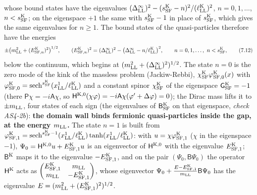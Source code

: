 \documentclass[
  10pt,
]{article}
\begin{document}
whose bound states have the eigenvalues
\((\Delta^\infty_{\rm LL})^2-(s^{\rm K}_{\rm SF}-n)^2/(\ell^{\rm K}_{\rm LL})^2\),
\(n=0,1,\dots\), \(n<s^{\rm K}_{\rm SF}\); on the eigenspace \(+1\) the
same with \(s^{\rm K}_{\rm SF}-1\) in place of \(s^{\rm K}_{\rm SF}\),
which gives the same eigenvalues for \(n\ge1\). The bound states of the
quasi-particles therefore have the energies
\[\pm\big(m_{\rm LL}^2+(E^{\rm K}_{{\rm SF},n})^2\big)^{1/2},\qquad(E^{\rm K}_{{\rm SF},n})^2=(\Delta^\infty_{\rm LL})^2-\big(\Delta^\infty_{\rm LL}-n/\ell^{\rm K}_{\rm LL}\big)^2,\qquad n=0,1,\dots,\ n<s^{\rm K}_{\rm SF},\tag{7.12}\]
below the continuum, which begins at
\((m_{\rm LL}^2+(\Delta^\infty_{\rm LL})^2)^{1/2}\). The state \(n=0\)
is the zero mode of the kink of the massless problem (Jackiw-Rebbi),
\(\chi^{\rm K}_{\rm SF}\varphi^{\rm K}_{{\rm SF},0}(x)\) with
\(\varphi^{\rm K}_{{\rm SF},0}=\mathrm{sech}^{s^{\rm K}_{\rm SF}}(x^1_{\rm LL}/\ell^{\rm K}_{\rm LL})\)
and a constant spinor \(\chi^{\rm K}_{\rm SF}\) of the eigenspace
\(\mathsf G^{\rm K}_{\rm SF}=-1\) (there
\(\mathsf P\chi=-i\mathsf A\chi\), so
\(\mathsf H^{{\rm K},0}(\chi\varphi)=-i\mathsf A\chi(\varphi'+\Delta\varphi)=0\));
the Dirac mass lifts it to \(\pm m_{\rm LL}\), four states of each sign
(the eigenvalues of \(\mathsf B^{\rm K}_{\rm SF}\) on that eigenspace,
\emph{check AS4-2b}): \textbf{the domain wall binds fermionic
quasi-particles inside the gap, at the energy \(m_{\rm LL}\).} The state
\(n=1\) is built from
\(\varphi^{\rm K}_{{\rm SF},1}=\mathrm{sech}^{s^{\rm K}_{\rm SF}-1}(x^1_{\rm LL}/\ell^{\rm K}_{\rm LL})\tanh(x^1_{\rm LL}/\ell^{\rm K}_{\rm LL})\):
with \(u=\chi\varphi^{\rm K}_{{\rm SF},1}\) (\(\chi\) in the eigenspace
\(-1\)), \(\Psi_0=\mathsf H^{{\rm K},0}u+E^{\rm K}_{{\rm SF},1}u\) is an
eigenvector of \(\mathsf H^{{\rm K},0}\) with the eigenvalue
\(E^{\rm K}_{{\rm SF},1}\); \(\mathsf B^{\rm K}\) maps it to the
eigenvalue \(-E^{\rm K}_{{\rm SF},1}\), and on the pair
\((\Psi_0,\mathsf B\Psi_0)\) the operator \(\mathsf H^{\rm K}\) acts as
\(\begin{pmatrix}E^{\rm K}_{{\rm SF},1}&m_{\rm LL}\\m_{\rm LL}&-E^{\rm K}_{{\rm SF},1}\end{pmatrix}\),
whose eigenvector
\(\Psi_0+\frac{E-E^{\rm K}_{{\rm SF},1}}{m_{\rm LL}}\mathsf B\Psi_0\)
has the eigenvalue
\(E=(m_{\rm LL}^2+(E^{\rm K}_{{\rm SF},1})^2)^{1/2}\).
\end{document}
